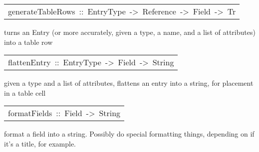 \begin{haddockdesc}
\item[\begin{tabular}{@{}l}
generateTableRows\ ::\ EntryType\ ->\ Reference\ ->\ {\char 91}Field{\char 93}\ ->\ Tr
\end{tabular}]\haddockbegindoc
turns an Entry (or more accurately, given a type, a name, and a list of attributes) into
 a table row
\par

\end{haddockdesc}
\begin{haddockdesc}
\item[\begin{tabular}{@{}l}
flattenEntry\ ::\ EntryType\ ->\ {\char 91}Field{\char 93}\ ->\ String
\end{tabular}]\haddockbegindoc
given a type and a list of attributes, flattens an entry into a string, for placement
 in a table cell
\par

\end{haddockdesc}
\begin{haddockdesc}
\item[\begin{tabular}{@{}l}
formatFields\ ::\ Field\ ->\ String
\end{tabular}]\haddockbegindoc
format a field into a string. Possibly do special formatting things, depending on 
 if it's a title, for example. 
\par

\end{haddockdesc}